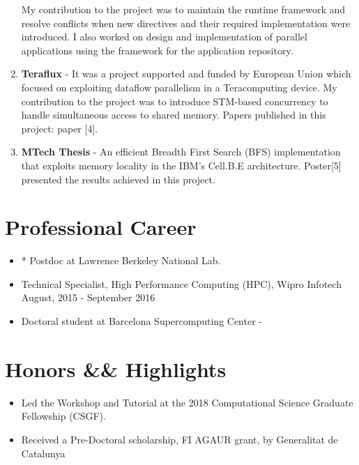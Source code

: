 \documentclass[margin]{res}
\begin{document}
\begin{resume}
\begin{enumerate}
			 My contribution to the project was to maintain the runtime framework and resolve conflicts when new directives and their required implementation were introduced.
			 I also worked on design and implementation of parallel applications using the framework for the application repository.
%
	   \item {\bf Teraflux} -
			 It was a project supported and funded by European Union which focused on exploiting dataflow parallelism in a Teracomputing device.
 	    		My contribution to the project was to introduce STM-based concurrency to handle simultaneous access to shared memory.
	     	Papers published in this project: paper [4].
%
	   \item {\bf MTech Thesis} -
		An efficient Breadth First Search (BFS) implementation that exploits memory locality in the IBM's Cell.B.E architecture.
		Poster[5] presented the results achieved in this project.
%
\end{enumerate}
%
%
\section{Professional Career}
%
\begin{itemize}
    \item * Postdoc at Lawrence Berkeley National Lab.  \\
%
	   \item Technical Specialist, High Performance Computing (HPC), Wipro Infotech \\
			 August, 2015 - September 2016 \\
%
	   \item Doctoral student at Barcelona Supercomputing Center - \\
\end{itemize}
%
\section{Honors \&\& Highlights}
\begin{itemize}
    \item Led the Workshop and Tutorial at the 2018 Computational Science Graduate Fellowship (CSGF).
    \item Received a Pre-Doctoral scholarship, FI AGAUR grant,  by Generalitat de Catalunya
\end{itemize}


\end{resume}
\end{document}
